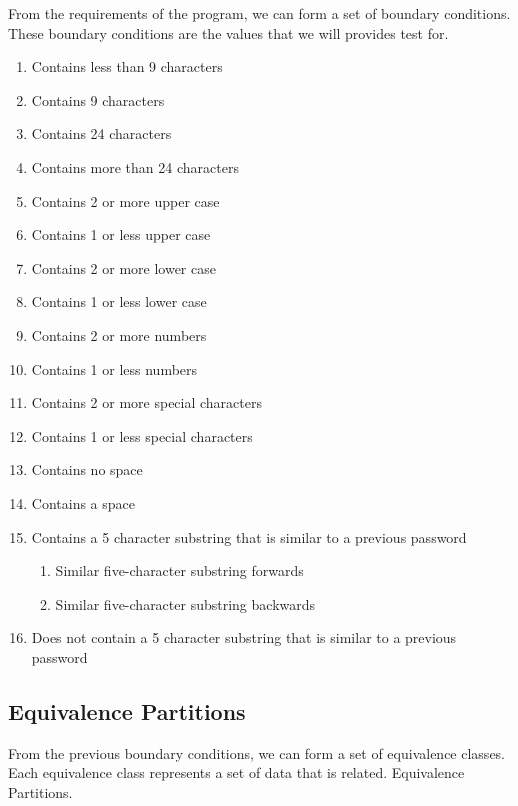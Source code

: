 \documentclass[12pt,letterpaper]{article}
\begin{document}
From the requirements of the program, we can form a set of boundary conditions. These
boundary conditions are the values that we will provides test for.

\begin{enumerate}
\item Contains less than 9 characters
\item Contains 9 characters
\item Contains 24 characters
\item Contains more than 24 characters
\item Contains 2 or more upper case
\item Contains 1 or less upper case
\item Contains 2 or more lower case
\item Contains 1 or less lower case
\item Contains 2 or more numbers
\item Contains 1 or less numbers
\item Contains 2 or more special characters
\item Contains 1 or less special characters
\item Contains no space
\item Contains a space
\item Contains a 5 character substring that is similar to a previous password
\begin{enumerate}
\item Similar five-character substring forwards
\item Similar five-character substring backwards
\end{enumerate}
\item Does not contain a 5 character substring that is similar to a previous password
\end{enumerate}


\subsection{Equivalence Partitions}

From the previous boundary conditions, we can form a set of equivalence classes. Each equivalence
class represents a set of data that is related.
\centering Equivalence Partitions.
\end{document}
